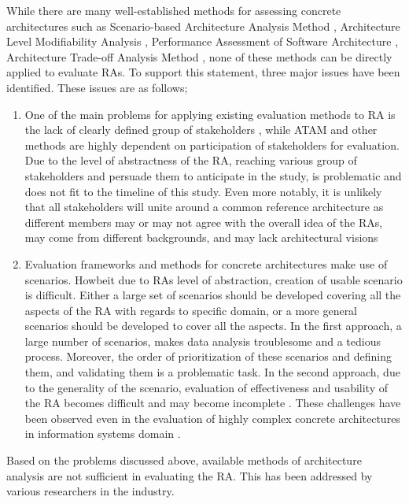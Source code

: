 \documentclass[review]{elsarticle}
\begin{document}
While there are many well-established methods for assessing concrete architectures such as Scenario-based Architecture Analysis Method \cite{kazman1994saam}, Architecture Level Modifiability Analysis \cite{Bengtsson}, Performance Assessment of Software Architecture \cite{Williams}, Architecture Trade-off Analysis Method \cite{KazmanATAM}, none of these methods can be directly applied to evaluate RAs. To support this statement, three major issues have been identified. These issues are as follows;

\begin{enumerate}
    \item One of the main problems for applying existing evaluation methods to RA is the lack of clearly defined group of stakeholders \cite{angelov2008towards}, while ATAM and other methods are highly dependent on participation of stakeholders for evaluation. Due to the level of abstractness of the RA, reaching various group of stakeholders and persuade them to anticipate in the study, is problematic and does not fit to the timeline of this study. Even more notably, it is unlikely that all stakeholders will unite around a common reference architecture as different members may or may not agree with the overall idea of the RAs, may come from different backgrounds, and may lack architectural visions
    \item Evaluation frameworks and methods for concrete architectures make use of scenarios. Howbeit due to RAs level of abstraction, creation of usable scenario is difficult. Either a large set of scenarios should be developed covering all the aspects of the RA with regards to specific domain, or a more general scenarios should be developed to cover all the aspects. In the first approach, a large number of scenarios, makes data analysis troublesome and a tedious process. Moreover, the order of prioritization of these scenarios and defining them, and validating them is a problematic task. In the second approach, due to the generality of the scenario, evaluation of effectiveness and usability of the RA becomes difficult and may become incomplete \cite{Avgeriou}. These challenges have been observed even in the evaluation of highly complex concrete architectures in information systems domain \cite{bengtsson1998scenario}.
\end{enumerate}

Based on the problems discussed above, available methods of architecture analysis are not sufficient in evaluating the RA. This has been addressed by various researchers in the industry.
\end{document}
